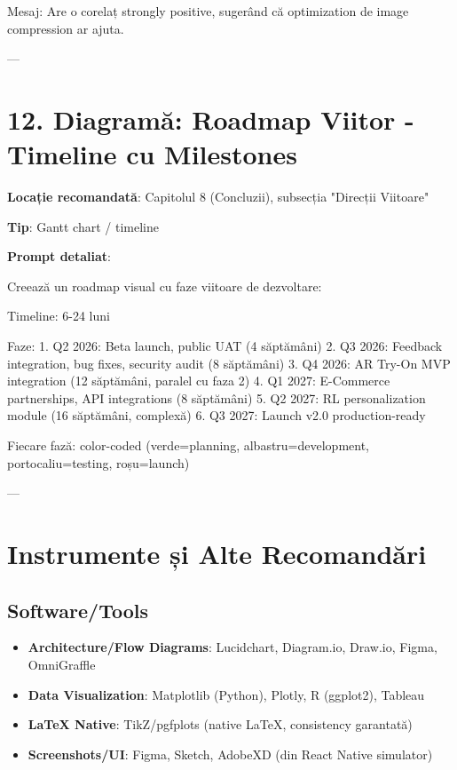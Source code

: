 Mesaj: Are o corelaț strongly positive, sugerând că optimization de image compression ar ajuta.

---

\section{12. Diagramă: Roadmap Viitor - Timeline cu Milestones}

\textbf{Locație recomandată}: Capitolul 8 (Concluzii), subsecția "Direcții Viitoare"

\textbf{Tip}: Gantt chart / timeline

\textbf{Prompt detaliat}:

Creează un roadmap visual cu faze viitoare de dezvoltare:

Timeline: 6-24 luni

Faze:
1. Q2 2026: Beta launch, public UAT (4 săptămâni)
2. Q3 2026: Feedback integration, bug fixes, security audit (8 săptămâni)
3. Q4 2026: AR Try-On MVP integration (12 săptămâni, paralel cu faza 2)
4. Q1 2027: E-Commerce partnerships, API integrations (8 săptămâni)
5. Q2 2027: RL personalization module (16 săptămâni, complexă)
6. Q3 2027: Launch v2.0 production-ready

Fiecare fază: color-coded (verde=planning, albastru=development, portocaliu=testing, roșu=launch)

---

\section{Instrumente și Alte Recomandări}

\subsection{Software/Tools}

\begin{itemize}
    \item \textbf{Architecture/Flow Diagrams}: Lucidchart, Diagram.io, Draw.io, Figma, OmniGraffle
    \item \textbf{Data Visualization}: Matplotlib (Python), Plotly, R (ggplot2), Tableau
    \item \textbf{LaTeX Native}: TikZ/pgfplots (native LaTeX, consistency garantată)
    \item \textbf{Screenshots/UI}: Figma, Sketch, AdobeXD (din React Native simulator)
\end{itemize}

